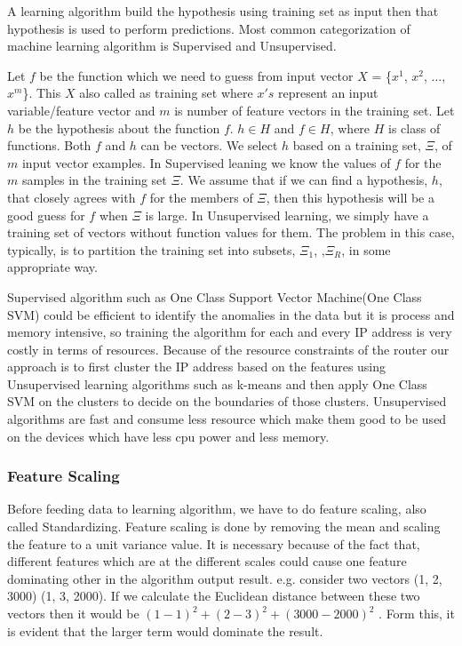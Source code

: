 \documentclass[10pt,oneside,a4paper]{article}
\begin{document}
A learning algorithm build the hypothesis using training set as input then that hypothesis is used to perform predictions. Most common categorization of machine learning algorithm is Supervised and Unsupervised.

Let $f$ be the function which we need to guess from input vector $X$ = \{$x^{1}$, $x^{2}$, ..., $x^{m}$\}. This $X$ also called as training set where $x's$ represent an input variable/feature vector and $m$ is number of feature vectors in the training set. Let $h$ be the hypothesis about the function $f$. $h \in H$ and $f \in H$, where $H$ is class of functions. Both $f$ and $h$ can be vectors. We select $h$ based on a training set, $\Xi$, of $m$ input vector examples. In Supervised leaning we know the values of $f$ for the $m$ samples in the training set $\Xi$. We assume that if we can find a hypothesis, $h$, that closely agrees with $f$ for the members of $\Xi$, then this hypothesis will be a good guess for $f$ when $\Xi$ is large. In Unsupervised learning, we simply have a training set of vectors without function values for them. The problem in this case, typically, is to partition the training set into subsets, $\Xi_1$,  ,$\Xi_R$, in some appropriate way.\cite{machineLearning}

Supervised algorithm such as One Class Support Vector Machine(One Class SVM)\cite{SVM} could be efficient to identify the anomalies in the data but it is process and memory intensive, so training the algorithm for each and every IP address is very costly in terms of resources. Because of the resource constraints of the router our approach is to first cluster the IP address based on the features using Unsupervised learning algorithms such as k-means and then apply One Class SVM on the clusters to decide on the boundaries of those clusters. Unsupervised algorithms are fast and consume less resource which make them good to be used on the devices which have less cpu power and less memory.

\subsubsection{Feature Scaling}

Before feeding data to learning algorithm, we have to do feature scaling, also called Standardizing. Feature scaling is done by removing the mean and scaling the feature to a unit variance value. It is necessary because of the fact that, different features which are at the different scales could cause one feature dominating other in the algorithm output result. e.g. consider two vectors (1, 2, 3000) (1, 3, 2000). If we calculate the Euclidean distance between these two vectors then it would be $(1-1)^2 + (2-3)^2 + (3000-2000)^2$ . Form this, it is evident that the larger term would dominate the result.
\end{document}
